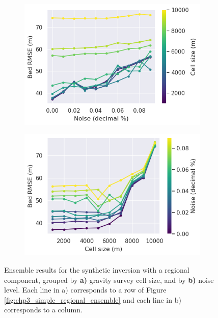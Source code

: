 \begin{figure}[!ht]
  \centering
    \begin{subfigure}[t]{.48\textwidth}
        \centering
        \includegraphics[width=\textwidth]{figures/chp3/chp3_simple_regional_ensemble_noise_lines.png}
        \caption{}
    \end{subfigure}
    \begin{subfigure}[t]{.48\textwidth}
        \centering
        \includegraphics[width=\textwidth]{figures/chp3/chp3_simple_regional_ensemble_cellsize_lines.png}
        \caption{}
    \end{subfigure}
  \caption[Grouped synthetic inversion with regional ensemble]{Ensemble results for the synthetic inversion with a regional component, grouped by \textbf{a)} gravity survey cell size, and by \textbf{b)} noise level. Each line in a) corresponds to a row of Figure \ref{fig:chp3_simple_regional_ensemble} and each line in b) corresponds to a column.}
    \label{fig:chp3_simple_regional_ensemble_lines}
\end{figure}


